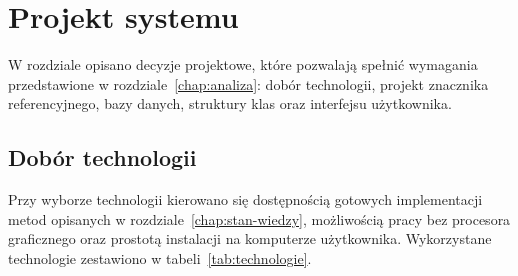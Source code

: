 
\chapter{Projekt systemu}
\label{chap:projekt}

W rozdziale opisano decyzje projektowe, które pozwalają spełnić wymagania przedstawione w rozdziale~\ref{chap:analiza}: dobór technologii, projekt znacznika referencyjnego, bazy danych, struktury klas oraz interfejsu użytkownika.

\section{Dobór technologii}
\label{sec:technologie}

Przy wyborze technologii kierowano się dostępnością gotowych implementacji metod opisanych w rozdziale~\ref{chap:stan-wiedzy}, możliwością pracy bez procesora graficznego oraz prostotą instalacji na komputerze użytkownika. Wykorzystane technologie zestawiono w tabeli~\ref{tab:technologie}.

